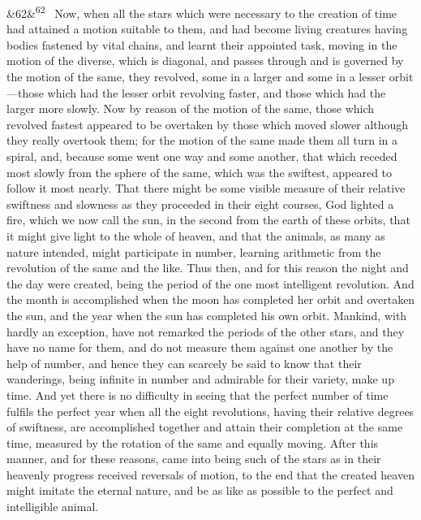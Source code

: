 \documentclass[12pt]{article}
\newcommand{\para}[1][]{\par\noindent\ifx&#1&\else\textsuperscript{\footnotesize #1}~\fi}
\begin{document}
\para[62] Now, when all the stars which were necessary to the creation of time had attained a motion suitable to them, and had become living creatures having bodies fastened by vital chains, and learnt their appointed task, moving in the motion of the diverse, which is diagonal, and passes through and is governed by the motion of the same, they revolved, some in a larger and some in a lesser orbit---those which had the lesser orbit revolving faster, and those which had the larger more slowly. Now by reason of the motion of the same, those which revolved fastest appeared to be overtaken by those which moved slower although they really overtook them; for the motion of the same made them all turn in a spiral, and, because some went one way and some another, that which receded most slowly from the sphere of the same, which was the swiftest, appeared to follow it most nearly. That there might be some visible measure of their relative swiftness and slowness as they proceeded in their eight courses, God lighted a fire, which we now call the sun, in the second from the earth of these orbits, that it might give light to the whole of heaven, and that the animals, as many as nature intended, might participate in number, learning arithmetic from the revolution of the same and the like. Thus then, and for this reason the night and the day were created, being the period of the one most intelligent revolution. And the month is accomplished when the moon has completed her orbit and overtaken the sun, and the year when the sun has completed his own orbit. Mankind, with hardly an exception, have not remarked the periods of the other stars, and they have no name for them, and do not measure them against one another by the help of number, and hence they can scarcely be said to know that their wanderings, being infinite in number and admirable for their variety, make up time. And yet there is no difficulty in seeing that the perfect number of time fulfils the perfect year when all the eight revolutions, having their relative degrees of swiftness, are accomplished together and attain their completion at the same time, measured by the rotation of the same and equally moving. After this manner, and for these reasons, came into being such of the stars as in their heavenly progress received reversals of motion, to the end that the created heaven might imitate the eternal nature, and be as like as possible to the perfect and intelligible animal.
\end{document}
